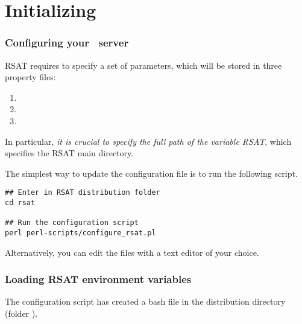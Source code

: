 \documentclass[12pt,a4paper, oneside]{scrreprt} %
\begin{document}


\chapter{Initializing \RSAT}

% 

\subsection{Configuring your \RSAT\ server}

RSAT requires to specify a set of parameters, which will be stored in
three property files:
\begin{enumerate}
\item  {}
\item  {}
\item  {}
\end{enumerate}

In particular, \emph{it is crucial to specify the full path of the
  variable RSAT}, which specifies the RSAT main directory.

The simplest way to update the configuration file is to run the
following script.

\begin{lstlisting}
## Enter in RSAT distribution folder
cd rsat

## Run the configuration script
perl perl-scripts/configure_rsat.pl
\end{lstlisting}

Alternatively, you can edit the files with a text editor of your
choice.

\subsection{Loading RSAT environment variables}

The configuration script has created a bash file
 in the \RSAT distribution directory (folder
). 
\end{document}

